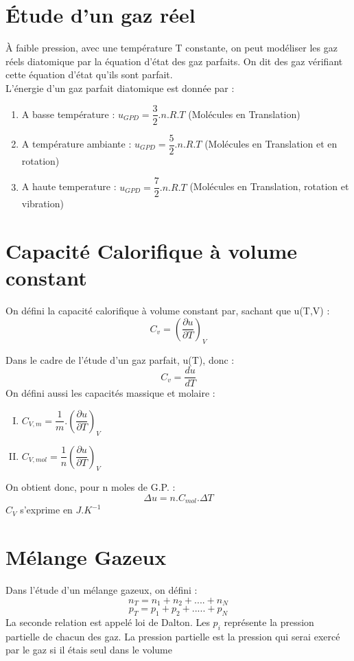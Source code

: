 \section{Étude d'un gaz réel}
À faible pression, avec une température T constante, on peut modéliser les gaz réels diatomique par la équation d'état des gaz parfaits. On dit des gaz vérifiant cette équation d'état qu'ils sont parfait.\\
L'énergie d'un gaz parfait diatomique est donnée par : 
\begin{enumerate}
 \item A basse température  : $u_{GPD} = \dfrac{3}{2}.n.R.T$ (Molécules en Translation)
 \item A température ambiante : $u_{GPD} = \dfrac{5}{2}.n.R.T$ (Molécules en Translation et en rotation)
 \item A haute temperature : $u_{GPD} = \dfrac{7}{2}.n.R.T$ (Molécules en Translation, rotation et vibration)
\end{enumerate}

\section{Capacité Calorifique à volume constant}
\begin{de}
 On défini la capacité calorifique à volume constant par, sachant que u(T,V) :
$$C_v = (\dfrac{\partial u}{\partial T})_V$$
\end{de}
Dans le cadre de l'étude d'un gaz parfait, u(T), donc :
$$C_v = \dfrac{du}{dT}$$
On défini aussi les capacités massique et molaire :
\begin{enumerate}[I) ]
 \item $C_{V,m} = \dfrac{1}{m}.(\dfrac{\partial u}{\partial T})_V$
 \item $C_{V,mol} = \dfrac{1}{n}(\dfrac{\partial u}{\partial T})_V$
\end{enumerate}
On obtient donc, pour n moles de G.P. :
$$\Delta u = n.C_{mol}.\Delta T$$
$C_V$ s'exprime en $J.K^{-1}$

\section{Mélange Gazeux}
Dans l'étude d'un mélange gazeux, on défini : 
$$n_T = n_1 + n_2 + .... + n_N$$
$$p_T = p_1 + p_2 + .....+ p_N$$ 
La seconde relation est appelé loi de Dalton. Les $p_i$ représente la pression partielle de chacun des gaz. La pression partielle est la pression qui serai exercé par le gaz si il étais seul dans le volume

